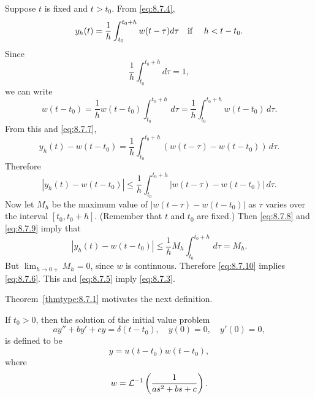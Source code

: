 Suppose $t$ is fixed and $t>t_{0}$. From \eqref{eq:8.7.4},
\begin{equation}
  \label{eq:8.7.7}y_{h}(t)=\frac{1}{h}\int_{t_{0}}^{t_{0}+h}w(t-\tau)d\tau\mbox{\quad if \quad}h<t-t_{0}.
\end{equation}
Since
\begin{equation}
  \label{eq:8.7.8}\frac{1}{h}\int_{t_{0}}^{t_{0}+h}d\tau=1,
\end{equation}
we can write
\[
  w(t-t_{0})=\frac{1}{h}w(t-t_{0})\int_{t_{0}}^{t_{0}+h}\,d\tau= \frac{1}{h}\int_{t_{0}}^{t_{0}+h}w(t-t_{0})\,d\tau.
\]
From this and \eqref{eq:8.7.7},
\[
  y_{h}(t)-w(t-t_{0})= \frac{1}{h}\int_{t_{0}}^{t_{0}+h}\left(w(t-\tau)-w(t-t_{0})\right)\,d\tau.
\]
Therefore
\begin{equation}
  \label{eq:8.7.9}|y_{h}(t)-w(t-t_{0})|\le \frac{1}{h}\int_{t_{0}}^{t_{0}+h}|w(t-\tau)-w(t-t_{0})|\,d\tau.
\end{equation}
Now let $M_{h}$ be the maximum value of $|w(t-\tau)-w(t-t_{0})|$ as $\tau$ varies over the interval
$[t_{0},t_{0}+h]$. (Remember that $t$ and $t_{0}$ are fixed.) Then \eqref{eq:8.7.8} and
\eqref{eq:8.7.9} imply that
\begin{equation}
  \label{eq:8.7.10}|y_{h}(t)-w(t-t_{0})|\le \frac{1}{h}M_{h}\int_{t_{0}}^{t_{0}+h}\,d\tau=M_{h}.
\end{equation}
But $\lim_{h\to0+}M_{h}=0$, since $w$ is continuous. Therefore \eqref{eq:8.7.10} implies
\eqref{eq:8.7.6}. This and \eqref{eq:8.7.5} imply \eqref{eq:8.7.3}. \bbox

Theorem~\ref{thmtype:8.7.1} motivates the next definition.

\begin{definition}
  \color{blue}
  \label{thmtype:8.7.2} \rm If $t_{0}>0$, then the solution of the initial value problem
  \begin{equation}
    \label{eq:8.7.11}ay''+by'+cy=\delta(t-t_{0}),\quad y(0)=0,\quad y'(0)=0,
  \end{equation}
  is defined to be
  \[
    y=u(t-t_{0})w(t-t_{0}),
  \]
  where
  \[
    w={\cal L}^{-1}\left(\frac{1}{as^{2}+bs+c}\right).
  \]
\end{definition}

